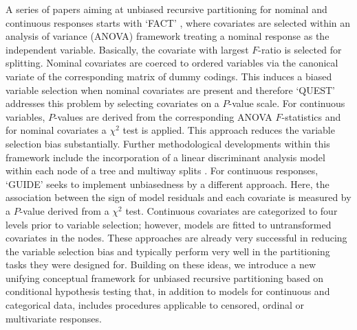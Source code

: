 A series of papers aiming at unbiased recursive partitioning for nominal and continuous 
responses starts with `FACT' \citep{LohVanichsetakul1988}, where covariates are
selected within an analysis of variance (ANOVA) 
framework treating a nominal response
as the independent variable. Basically, the covariate with largest $F$-ratio is
selected for splitting. Nominal covariates are coerced to ordered variables
via the canonical variate of the corresponding matrix of dummy codings. This
induces a biased variable selection when nominal covariates are present and
therefore `QUEST' \citep{LohShih1997} addresses this problem by selecting
covariates on a $P$-value scale. 
For continuous variables, $P$-values are derived from the
corresponding ANOVA $F$-statistics and for nominal covariates a $\chi^2$
test is applied. This approach reduces the variable selection bias
substantially. 
Further methodological developments within this framework
include the incorporation of a linear
discriminant analysis model within each node of a tree \citep{KimLoh2003}
and multiway splits \citep[`CRUISE',][]{classifica:2001}.
For continuous responses, `GUIDE' \citep{Loh2002} seeks to implement
unbiasedness by a different approach. Here, the association between the sign
of model residuals and each covariate is measured by a $P$-value derived
from a $\chi^2$ test. Continuous covariates are categorized to four
levels prior to variable selection; however, models are 
fitted to untransformed covariates in the nodes.
These approaches are already very successful in reducing the variable 
selection bias and typically perform very well in the partitioning tasks
they were designed for. Building on these ideas, we introduce a new unifying
conceptual framework for unbiased recursive partitioning based on 
conditional hypothesis testing that, in addition to models for continuous and
categorical data, includes procedures applicable to
censored, ordinal or multivariate responses.





